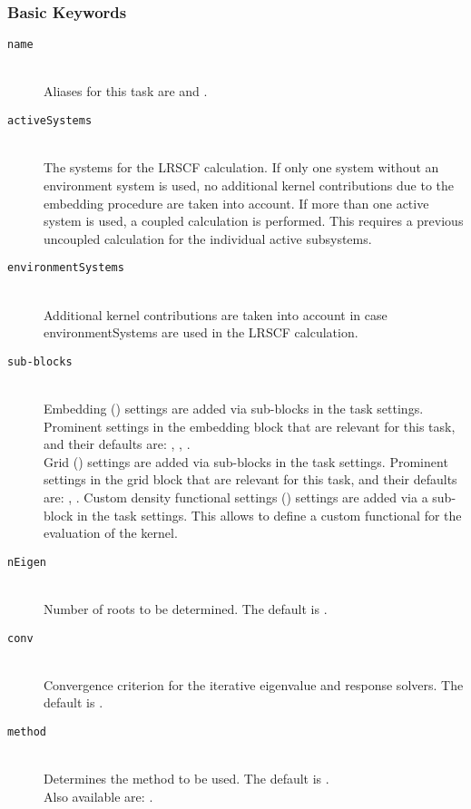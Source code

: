 \subsubsection{Basic Keywords}
\begin{description}
    \item [\texttt{name}]\hfill \\
    Aliases for this task are  and .
    \item [\texttt{activeSystems}]\hfill \\
    The systems for the LRSCF calculation. If only one system without an environment system is used, no additional kernel contributions due to the embedding procedure are taken into account. If more than one active system is used, a coupled calculation is performed. This requires a previous uncoupled calculation for the individual active subsystems.
    \item [\texttt{environmentSystems}]\hfill \\
    Additional kernel contributions are taken into account in case environmentSystems are used in the LRSCF calculation.
    \item [\texttt{sub-blocks}]\hfill \\
    Embedding () settings are added via sub-blocks in the task settings.
    Prominent settings in the embedding block that are relevant for this task, and their defaults are:
    , , .\\
    Grid () settings are added via sub-blocks in the task settings.
    Prominent settings in the grid block that are relevant for this task, and their defaults are:
    , .
    Custom density functional settings () settings are added via a sub-block in the task settings. This allows to define a custom functional for the evaluation of the kernel.
    \item [\texttt{nEigen}]\hfill \\
    Number of roots to be determined. The default is .
    \item [\texttt{conv}]\hfill \\
    Convergence criterion for the iterative eigenvalue and response solvers. The default is .
    \item [\texttt{method}]\hfill \\
    Determines the method to be used. The default is . \\ Also available are: .

\end{description}
